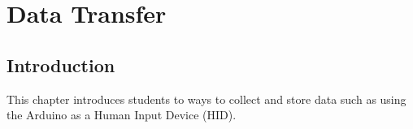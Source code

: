 \chapter{Data Transfer}

\section{Introduction}
This chapter introduces students to ways to collect and store data such as using the Arduino as a Human Input Device (HID).
